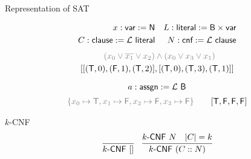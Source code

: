 \documentclass[11pt,usenames,dvipsnames,
  hyperref={pdfencoding=auto,psdextra}]{beamer}
\begin{document}
\begin{frame}[allowframebreaks]{Representation of SAT}

\begin{align*}
  x : \textsf{var} := \mathsf{N}&& 
  L : \textsf{literal} := \textsf{B} \times \textsf{var} \\
  C : \textsf{clause} := \mathcal{L}~ \textsf{literal} &&
  N : \textsf{cnf} := \mathcal{L}~ \textsf{clause} 
\end{align*}
\begin{align*}
  \color{gray}(x_0 \lor \overline{x_1} \lor x_2) &\color{gray}\land (x_0 \lor x_3 \lor x_1)\\
  [[(\btrue, 0), (\bfalse, 1), (\btrue, 2)]&, [(\btrue, 0), (\btrue, 3), (\btrue, 1)]]
\end{align*}

\[ a : \textsf{assgn} := \mathcal{L}~ \textsf{B}\]
\begin{align*}   
  {\color{gray}\{x_0 \mapsto \btrue, x_1 \mapsto \bfalse, x_2 \mapsto \bfalse, x_3 \mapsto \bfalse\}}\qquad 
  [\btrue, \bfalse, \bfalse, \bfalse] 
\end{align*}

\pagebreak
\begin{block}{$k$-CNF}
\begin{align*}
\infer{\textsf{$k$-CNF}~[]}{} && \infer{\textsf{$k$-CNF}~(C::N)}{\textsf{$k$-CNF}~N \quad \length{C} = k} 
\end{align*}
\end{block}
\end{frame}
\end{document}
